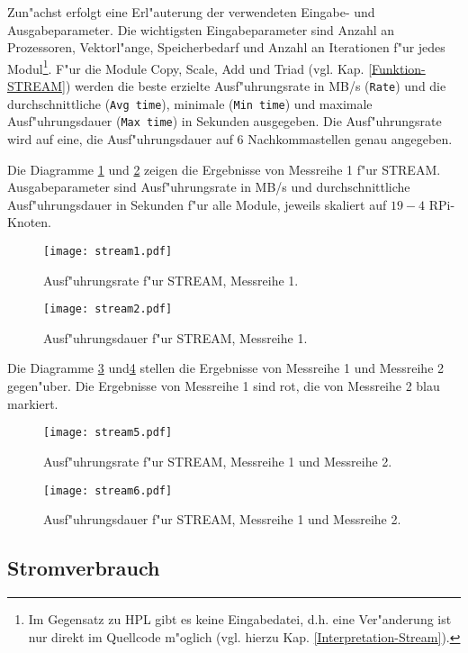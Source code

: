 Zun"achst erfolgt eine Erl"auterung der verwendeten Eingabe- und Ausgabeparameter. Die wichtigsten Eingabeparameter sind Anzahl an Prozessoren, Vektorl"ange, Speicherbedarf und Anzahl an Iterationen f"ur jedes Modul\footnote{Im Gegensatz zu HPL gibt es keine Eingabedatei, d.h. eine Ver"anderung ist nur direkt im Quellcode m"oglich (vgl. hierzu Kap. \ref{Interpretation-Stream}).}. F"ur die Module Copy, Scale, Add und Triad (vgl. Kap. \ref{Funktion-STREAM}) werden die beste erzielte Ausf"uhrungsrate in MB/s (\texttt{Rate}) und die durchschnittliche (\texttt{Avg time}), minimale (\texttt{Min time}) und maximale Ausf"uhrungsdauer (\texttt{Max time}) in Sekunden ausgegeben. Die Ausf"uhrungsrate wird auf eine, die Ausf"uhrungsdauer auf 6 Nachkommastellen genau angegeben. 

Die Diagramme \ref{fig:stream1} und \ref{fig:stream2} zeigen die Ergebnisse von Messreihe 1 f"ur STREAM. Ausgabeparameter sind Ausf"uhrungsrate in MB/s und durchschnittliche Ausf"uhrungsdauer in Sekunden f"ur alle Module, jeweils skaliert auf $19-4$ RPi-Knoten. 
\begin{figure}[htb]
  \centering
  \texttt{[image: stream1.pdf]}\\ 
  \caption{Ausf"uhrungsrate f"ur STREAM, Messreihe 1.}
  \label{fig:stream1}		
\end{figure}
\begin{figure}[htb]
  \centering
  \texttt{[image: stream2.pdf]}\\ 
  \caption{Ausf"uhrungsdauer f"ur STREAM, Messreihe 1.}
  \label{fig:stream2}		
\end{figure}

\noindent
Die Diagramme \ref{fig:stream5} und\ref{fig:stream6} stellen die Ergebnisse von Messreihe 1 und Messreihe 2 gegen"uber. Die Ergebnisse von Messreihe 1 sind rot, die von Messreihe 2 blau markiert. 
\begin{figure}[htb]
  \centering
  \texttt{[image: stream5.pdf]}\\ 
  \caption{Ausf"uhrungsrate f"ur STREAM, Messreihe 1 und Messreihe 2.}\label{fig:stream5}
\end{figure}
\begin{figure}[htb]
  \centering
  \texttt{[image: stream6.pdf]}\\ 
  \caption{Ausf"uhrungsdauer f"ur STREAM, Messreihe 1 und Messreihe 2.}\label{fig:stream6}
\end{figure}

\subsection{Stromverbrauch}\label{Ergebnisse-Energenie}

